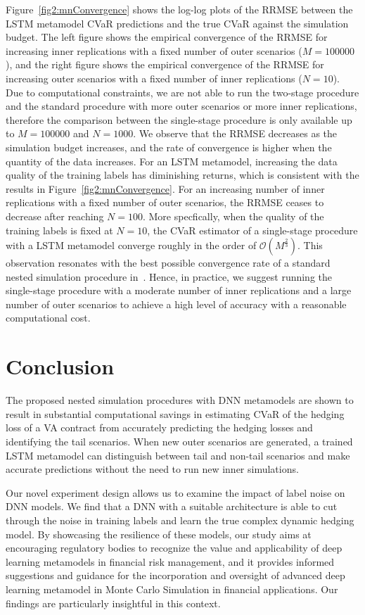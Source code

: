 Figure~\ref{fig2:mnConvergence} shows the log-log plots of the RRMSE between the LSTM metamodel CVaR predictions and the true CVaR against the simulation budget.
The left figure shows the empirical convergence of the RRMSE for increasing inner replications with a fixed number of outer scenarios ($M=\num{100000}$), and the right figure shows the empirical convergence of the RRMSE for increasing outer scenarios with a fixed number of inner replications ($N=\num{10}$).
Due to computational constraints, we are not able to run the two-stage procedure and the standard procedure with more outer scenarios or more inner replications, therefore the comparison between the single-stage procedure is only available up to $M = \num{100000}$ and $N = \num{1000}$.
We observe that the RRMSE decreases as the simulation budget increases, and the rate of convergence is higher when the quantity of the data increases.
For an LSTM metamodel, increasing the data quality of the training labels has diminishing returns, which is consistent with the results in Figure~\ref{fig2:mnConvergence}.
For an increasing number of inner replications with a fixed number of outer scenarios, the RRMSE ceases to decrease after reaching $N = \num{100}$. 
More specfically, when the quality of the training labels is fixed at $N = \num{10}$, the CVaR estimator of a single-stage procedure with a LSTM metamodel converge roughly in the order of $\mathcal{O}(M^{\frac{2}{3}})$.
This observation resonates with the best possible convergence rate of a standard nested simulation procedure in~\cite{gordy2010nested}.
Hence, in practice, we suggest running the single-stage procedure with a moderate number of inner replications and a large number of outer scenarios to achieve a high level of accuracy with a reasonable computational cost.


\section{Conclusion} \label{sec2:conclusion}
The proposed nested simulation procedures with DNN metamodels are shown to result in substantial computational savings in estimating CVaR of the hedging loss of a VA contract from accurately predicting the hedging losses and identifying the tail scenarios.
When new outer scenarios are generated, a trained LSTM metamodel can distinguish between tail and non-tail scenarios and make accurate predictions without the need to run new inner simulations.

Our novel experiment design allows us to examine the impact of label noise on DNN models.
We find that a DNN with a suitable architecture is able to cut through the noise in training labels and learn the true complex dynamic hedging model.
By showcasing the resilience of these models, our study aims at encouraging regulatory bodies to recognize the value and applicability of deep learning metamodels in financial risk management, and it provides informed suggestions and guidance for the incorporation and oversight of advanced deep learning metamodel in Monte Carlo Simulation in financial applications.
Our findings are particularly insightful in this context.


